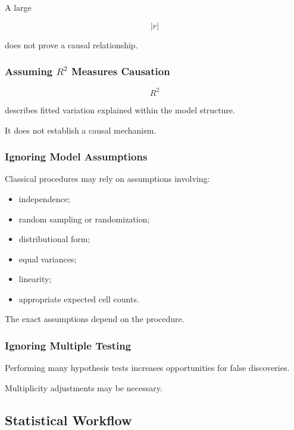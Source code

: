 A large

\[
|r|
\]

does not prove a causal relationship.

\subsubsection{Assuming \(R^2\) Measures Causation}

\[
R^2
\]

describes fitted variation explained within the model structure.

It does not establish a causal mechanism.

\subsubsection{Ignoring Model Assumptions}

Classical procedures may rely on assumptions involving:

\begin{itemize}
    \item independence;
    \item random sampling or randomization;
    \item distributional form;
    \item equal variances;
    \item linearity;
    \item appropriate expected cell counts.
\end{itemize}

The exact assumptions depend on the procedure.

\subsubsection{Ignoring Multiple Testing}

Performing many hypothesis tests increases opportunities for false
discoveries.

Multiplicity adjustments may be necessary.

\subsection{Statistical Workflow}
\label{subsec:statistical-reference-workflow}

